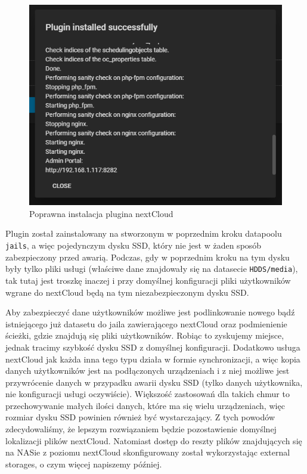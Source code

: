 \documentclass[12pt,a4paper]{article}
\newcommand{\<}{\langle}
\renewcommand{\>}{\rangle}
\theoremstyle{definition}
\begin{document}
\begin{figure}[H]
    \centering
    \includegraphics[width=\linewidth]{img/ss_cloud/29.png}
    \caption{Poprawna instalacja plugina nextCloud}
\end{figure}

Plugin został zainstalowany na stworzonym w poprzednim kroku datapoolu \texttt{jails}, a więc pojedynczym dysku SSD, który nie jest w żaden sposób zabezpieczony przed awarią. Podczas, gdy w poprzednim kroku na tym dysku były tylko pliki usługi (właściwe dane znajdowały się na datasecie \texttt{HDDS/media}), tak tutaj jest troszkę inaczej i przy domyślnej konfiguracji pliki użytkowników wgrane do nextCloud będą na tym niezabezpieczonym dysku SSD.

Aby zabezpieczyć dane użytkowników możliwe jest podlinkowanie nowego bądź istniejącego już datasetu do jaila zawierającego nextCloud oraz podmienienie ścieżki, gdzie znajdują się pliki użytkowników. Robiąc to zyskujemy miejsce, jednak tracimy szybkość dysku SSD z domyślnej konfiguracji. Dodatkowo usługa nextCloud jak każda inna tego typu działa w formie synchronizacji, a więc kopia danych użytkowników jest na podłączonych urządzeniach i z niej możliwe jest przywrócenie danych w przypadku awarii dysku SSD (tylko danych użytkownika, nie konfiguracji usługi oczywiście). Większość zastosowań dla takich chmur to przechowywanie małych ilości danych, które ma się wielu urządzeniach, więc rozmiar dysku SSD powinien również być wystarczający. Z tych powodów zdecydowaliśmy, że lepszym rozwiązaniem będzie pozostawienie domyślnej lokalizacji plików nextCloud. Natomiast dostęp do reszty plików znajdujących się na NASie z poziomu nextCloud skonfigurowany został wykorzystając external storages, o czym więcej napiszemy później.
\end{document}
